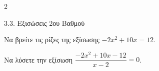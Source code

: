 \begin{ylh}{2}
    \item 3.3. Εξισώσεις 2ου Βαθμού
\end{ylh}

\begin{alist}
\item Να βρείτε τις ρίζες της εξίσωσης $-2x^2 + 10x = 12$.
\item Να λύσετε την εξίσωση $\dfrac{-2x^2 + 10x - 12}{x - 2} = 0$.
\end{alist}

